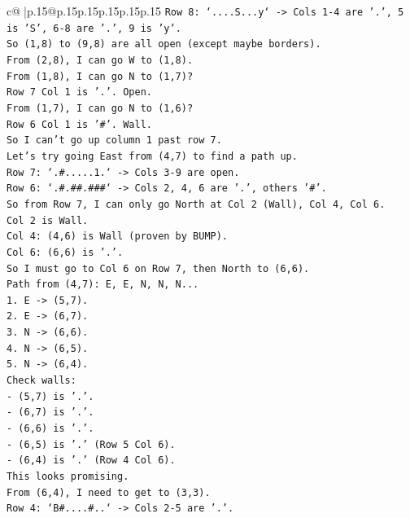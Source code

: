 \documentclass{article}
\begin{document}
{\begin{supertabular}{c@{$\;$}|p{.15\linewidth}@{}p{.15\linewidth}p{.15\linewidth}p{.15\linewidth}p{.15\linewidth}p{.15\linewidth}}
{{{\texttt{Row 8: `....S...y` {-}> Cols 1{-}4 are '.', 5 is 'S', 6{-}8 are '.', 9 is 'y'.} \\
\texttt{So (1,8) to (9,8) are all open (except maybe borders).} \\
\texttt{From (2,8), I can go W to (1,8).} \\
\texttt{From (1,8), I can go N to (1,7)?} \\
\texttt{Row 7 Col 1 is '.'. Open.} \\
\texttt{From (1,7), I can go N to (1,6)?} \\
\texttt{Row 6 Col 1 is '\#'. Wall.} \\
\texttt{So I can't go up column 1 past row 7.} \\
\texttt{Let's try going East from (4,7) to find a path up.} \\
\texttt{Row 7: `.\#.....1.` {-}> Cols 3{-}9 are open.} \\
\texttt{Row 6: `.\#.\#\#.\#\#\#` {-}> Cols 2, 4, 6 are '.', others '\#'.} \\
\texttt{So from Row 7, I can only go North at Col 2 (Wall), Col 4, Col 6.} \\
\texttt{Col 2 is Wall.} \\
\texttt{Col 4: (4,6) is Wall (proven by BUMP).} \\
\texttt{Col 6: (6,6) is '.'.} \\
\texttt{So I must go to Col 6 on Row 7, then North to (6,6).} \\
\texttt{Path from (4,7): E, E, N, N, N...} \\
\texttt{1. E {-}> (5,7).} \\
\texttt{2. E {-}> (6,7).} \\
\texttt{3. N {-}> (6,6).} \\
\texttt{4. N {-}> (6,5).} \\
\texttt{5. N {-}> (6,4).} \\
\texttt{Check walls:} \\
\texttt{{-} (5,7) is '.'.} \\
\texttt{{-} (6,7) is '.'.} \\
\texttt{{-} (6,6) is '.'.} \\
\texttt{{-} (6,5) is '.' (Row 5 Col 6).} \\
\texttt{{-} (6,4) is '.' (Row 4 Col 6).} \\
\texttt{This looks promising.} \\
\texttt{From (6,4), I need to get to (3,3).} \\
\texttt{Row 4: `B\#....\#..` {-}> Cols 2{-}5 are '.'.} \\
}}}
\end{supertabular}}
\end{document}
